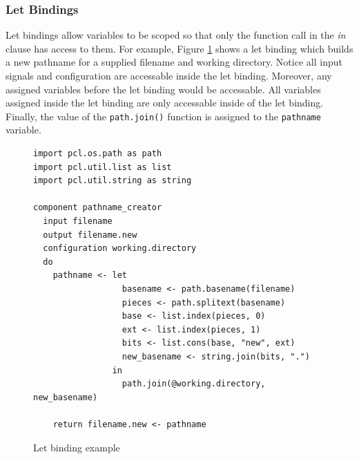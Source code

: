 \subsubsection{Let Bindings}
Let bindings allow variables to be scoped so that only the function call in the \emph{in} clause has access to them. For example, Figure \ref{fig:imperative-pcl-let-binding-example} shows a let binding which builds a new pathname for a supplied filename and working directory. Notice all input signals and configuration are accessable inside the let binding. Moreover, any assigned variables before the let binding would be accessable. All variables assigned inside the let binding are only accessable inside of the let binding. Finally, the value of the \texttt{path.join()} function is assigned to the \texttt{pathname} variable.
\begin{figure}[h!]
  \begin{verbatim}
import pcl.os.path as path
import pcl.util.list as list
import pcl.util.string as string

component pathname_creator
  input filename
  output filename.new
  configuration working.directory
  do
    pathname <- let
                  basename <- path.basename(filename)
                  pieces <- path.splitext(basename)
                  base <- list.index(pieces, 0)
                  ext <- list.index(pieces, 1)
                  bits <- list.cons(base, "new", ext)
                  new_basename <- string.join(bits, ".")
                in
                  path.join(@working.directory, new_basename)

    return filename.new <- pathname
  \end{verbatim}
  \caption{Let binding example}
  \label{fig:imperative-pcl-let-binding-example}
\end{figure}

